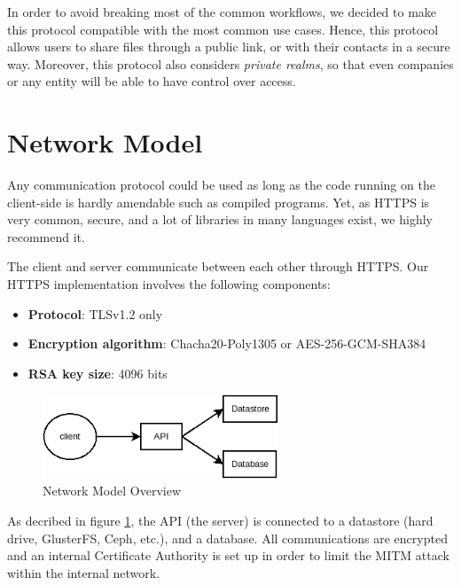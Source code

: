 \documentclass[a4paper,9pt,twoside]{article}
\begin{document}
    In order to avoid breaking most of the common workflows, we decided to make this protocol compatible with the most common
 use cases. Hence, this protocol allows users to share files through a public link, or with their contacts 
in a secure way. Moreover, this protocol also considers \emph{private realms}, 
so that even companies or any entity will be able to have control over access.




\section{Network Model}

Any communication protocol could be used as long as the code running on the 
client-side is hardly amendable such as compiled programs. Yet, as HTTPS is very common, secure, 
and a lot of libraries in many languages exist, we highly recommend it.

The client and server communicate between each other through HTTPS.
Our HTTPS implementation involves the following components:

\begin{itemize}
\item \textbf{Protocol}: TLSv1.2 only
\item \textbf{Encryption algorithm}: Chacha20-Poly1305 or AES-256-GCM-SHA384
\item \textbf{RSA key size}: 4096 bits
\end{itemize}

\begin{figure}[H]
\centering
\includegraphics[width=70mm]{./diagram/network_model.png}
\caption{Network Model Overview \label{networkmodel}}
\end{figure}

    As decribed in figure \ref{networkmodel}, the API (the server) is connected to a datastore (hard drive, 
GlusterFS, Ceph, etc.), and a database. All communications are encrypted and an internal Certificate 
Authority is set up in order to limit the MITM attack within the internal network.
\end{document}
